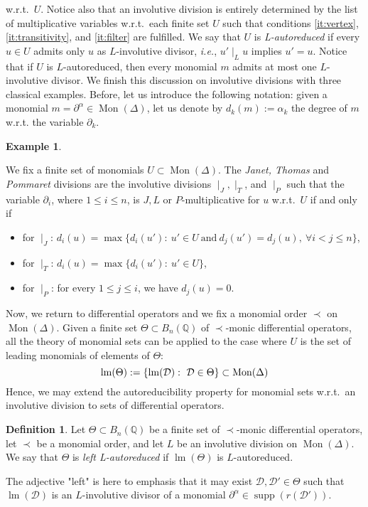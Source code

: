 \documentclass[10pt]{easychair}
\theoremstyle{definition}
\newtheorem{definition}[theorem]{Definition}
\newtheorem{example}[theorem]{Example}
\newcommand\ie{\emph{i.e.}}
\DeclareMathOperator{\supp}{supp}
\newcommand\D{\mathcal{D}}
\DeclareMathOperator{\lm}{lm}
\newcommand\Q{\mathbb{Q}}
\newcommand\Weyl[1]{B_{#1}(\Q)}
\newcommand\monBasis{\Mon(\Delta)}
\DeclareMathOperator{\Mon}{Mon}
\newcommand\divInv[1]{\mid_{#1}}
\begin{document}
w.r.t.\ $U$. Notice also that an involutive division is entirely
determined by the list of multiplicative variables w.r.t.\ each finite
set $U$ such that conditions \ref{it:vertex}, \ref{it:transitivity}, and
\ref{it:filter} are fulfilled. We say that $U$ is {\em L-autoreduced} if
every $u\in U$ admits only $u$ as $L$-involutive divisor, \ie,
$u'\divInv{L}u$ implies $u'=u$. Notice that if $U$ is $L$-autoreduced,
then every monomial $m$ admits at most one $L$-involutive divisor. We
finish this discussion on involutive divisions with three classical
examples. Before, let us introduce the following notation: given a
monomial $m=\partial^\alpha\in\monBasis$, let us denote by
$d_k(m):=\alpha_k$ the degree of $m$ w.r.t. the variable $\partial_k$.
\smallskip

\begin{example}\label{ex:involutive_division}

  We fix a finite set of monomials $U\subset\monBasis$. The
  {\em Janet, Thomas} and {\em Pommaret} divisions are the involutive
  divisions $\divInv{J},\divInv{T}$, and $\divInv{P}$ such that the
  variable $\partial_i$, where $1\leq i\leq n$, is
  $J,L$ or $P$-multiplicative for $u$ w.r.t.\ $U$ if and only if 
  \begin{itemize}
  \item for $\divInv{J}$: $d_i(u)=\max\{d_i(u'):\ u'\in U\ \text{and}\
    d_j(u')=d_j(u),\ \forall i<j\leq n\}$, 
  \item for $\divInv{T}$: $d_i(u)=\max\{d_i(u'):\ u'\in U\}$,
  \item for $\divInv{P}$: for every $1\leq j\leq i$, we have $d_j(u)=0$.
  \end{itemize}

  
\end{example}
\smallskip

Now, we return to differential operators and we fix a monomial order
$\prec$ on $\monBasis$. Given a finite set $\Theta\subset\Weyl{n}$ of
$\prec$-monic differential operators, all the theory of monomial sets can
be applied to the case where $U$ is the set of leading monomials of
elements of $\Theta$:
\[\lm(\Theta):=\left\{\lm(\D):\ \D\in\Theta\right\}\subset\monBasis
\smallskip\]
Hence, we may extend the autoreducibility property for monomial sets
w.r.t.\ an involutive division to sets of differential operators.
\smallskip

\begin{definition}
  Let $\Theta\subset\Weyl{n}$ be a finite set of $\prec$-monic
  differential operators, let $\prec$ be a monomial order, and let $L$ be
  an involutive division on $\Mon(\Delta)$. We say that $\Theta$ is
  {\em left L-autoreduced} if $\lm(\Theta)$ is $L$-autoreduced.
\end{definition}
\smallskip
\noindent
The adjective "left" is here to emphasis that it may exist
$\D,\D'\in\Theta$ such that $\lm(\D)$ is an $L$-involutive divisor of a
monomial $\partial^\alpha\in\supp(r(\D'))$.
\medskip
\end{document}
